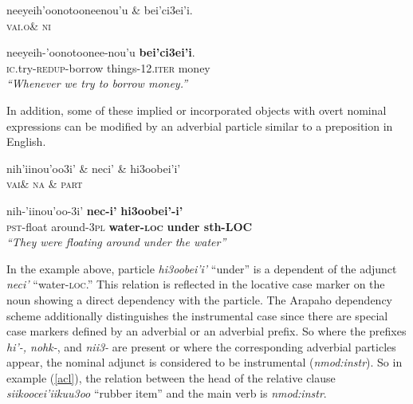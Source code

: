 \documentclass[11pt]{article}
\begin{document}
\small
\begin{exe}
\ex \label{nmod:objim}%
\begin{dependency}
\begin{deptext}
neeyeih'oonotooneenou'u \& bei'ci3ei'i.\\
\textsc{vai.o}\& \textsc{ni}\\
\end{deptext}
\end{dependency}
\gll neeyeih-'oonotoonee-nou'u \textbf{bei'ci3ei'i}.\\
{\textsc{ic}.try-\textsc{redup}-borrow things-12.\textsc{iter}} money\\
\trans \textit{``Whenever we try to borrow money.''}
\end{exe}

\normalsize
In addition, some of these implied or incorporated objects with overt nominal expressions can be modified by an adverbial particle similar to a preposition in English. 

\small
\begin{exe}
\ex \label{objad}
\begin{dependency}
\begin{deptext}
nih'iinou'oo3i' \& neci' \& hi3oobei'i'\\
\textsc{vai}\& \textsc{na} \& \textsc{part}\\
\end{deptext}
\end{dependency}
\gll nih-'iinou'oo-3i' \textbf{nec-i'} \textbf{hi3oobei'-i'}\\
{\textsc{pst}-float around-\textsc{3pl}} \textbf{water-\textsc{loc}} \textbf{{under sth-LOC}}\\
\trans \textit{``They were floating around under the water''}
\end{exe}

\normalsize
In the example above, particle \textit{hi3oobei'i'} ``under'' is a dependent of the adjunct \textit{neci'} ``water-\textsc{loc}.'' This relation is reflected in the locative case marker on the noun showing a direct dependency with the particle. The Arapaho dependency scheme additionally distinguishes the instrumental case since there are special case markers defined by an adverbial or an adverbial prefix. So where the prefixes \textit{hi'-, nohk-}, and \textit{nii3-} are present or where the corresponding adverbial particles appear, the nominal adjunct is considered to be instrumental (\textit{nmod:instr}). So in example (\ref{acl}), the relation between the head of the relative clause \textit{siikoocei'iikuu3oo} ``rubber item'' and the main verb is \textit{nmod:instr}. 
\end{document}
